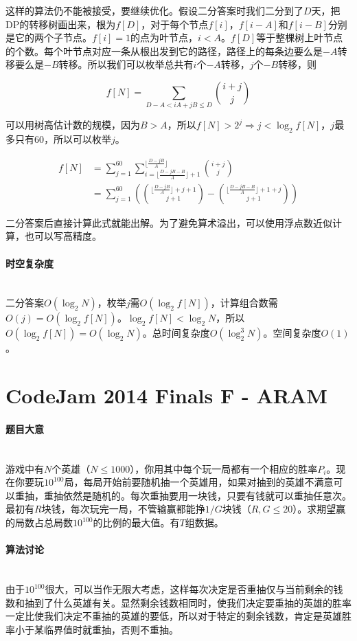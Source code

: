\documentclass[UTF8]{ctexart}
\newcommand{\myparagraph}[1]{\paragraph{#1}\mbox{}\\}
\theoremstyle{nonumberplain}
\begin{document}
			这样的算法仍不能被接受，要继续优化。假设二分答案时我们二分到了$D$天，把DP的转移树画出来，根为$f[D]$，对于每个节点$f[i]$，$f[i-A]$和$f[i-B]$分别是它的两个子节点。$f[i]=1$的点为叶节点，$i<A$。$f[D]$等于整棵树上叶节点的个数。每个叶节点对应一条从根出发到它的路径，路径上的每条边要么是$-A$转移要么是$-B$转移。所以我们可以枚举总共有$i$个$-A$转移，$j$个$-B$转移，则
			
			$$f[N]=\sum_{D-A<iA+jB\leq D}\binom{i+j}{j}$$
			
			可以用树高估计数的规模，因为$B>A$，所以$f[N]>2^j \Rightarrow j<\log_2f[N]$，$j$最多只有60，所以可以枚举$j$。
			
			$$\begin{aligned}
				f[N]&=\sum_{j=1}^{60}\sum_{i=\lfloor \frac{D-jB-B}{A} \rfloor+1}^{\lfloor \frac{D-jB}{A} \rfloor} \binom{i+j}{j} \\
				    &=\sum_{j=1}^{60}(\binom{\lfloor \frac{D-jB}{A} \rfloor+j+1}{j+1}-\binom{\lfloor \frac{D-jB-B}{A} \rfloor+1+j}{j+1})
			\end{aligned}$$
			
			二分答案后直接计算此式就能出解。为了避免算术溢出，可以使用浮点数近似计算，也可以写高精度。
		
		\myparagraph{时空复杂度}
		
			二分答案$O(\log_2N)$，枚举$j$需$O(\log_2{f[N]})$，计算组合数需$O(j)=O(\log_2{f[N]})$。$\log_2{f[N]}<\log_2N$，所以$O(\log_2{f[N]})=O(\log_2N)$。总时间复杂度$O(\log_2^3{N})$。空间复杂度$O(1)$。
	
	\section{CodeJam 2014 Finals F - ARAM}
	
		\myparagraph{题目大意}
		
			游戏中有$N$个英雄（$N \leq 1000$），你用其中每个玩一局都有一个相应的胜率$P_i$。现在你要玩$10^{100}$局，每局开始前要随机抽一个英雄用，如果对抽到的英雄不满意可以重抽，重抽依然是随机的。每次重抽要用一块钱，只要有钱就可以重抽任意次。最初有$R$块钱，每次玩完一局，不管输赢都能挣$1/G$块钱（$R,G \leq 20$）。求期望赢的局数占总局数$10^{100}$的比例的最大值。有$T$组数据。
		
		\myparagraph{算法讨论}
		
			由于$10^{100}$很大，可以当作无限大考虑，这样每次决定是否重抽仅与当前剩余的钱数和抽到了什么英雄有关。显然剩余钱数相同时，使我们决定要重抽的英雄的胜率一定比使我们决定不重抽的英雄的要低，所以对于特定的剩余钱数，肯定是英雄胜率小于某临界值时就重抽，否则不重抽。
			
\end{document}
